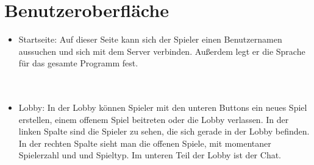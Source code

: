 \documentclass{article}
\begin{document}
\section{Benutzeroberfläche}
\begin{itemize}
	\item Startseite:  Auf dieser Seite kann sich der Spieler einen Benutzernamen aussuchen und sich mit dem Server verbinden. Außerdem legt er die Sprache für das gesamte Programm fest.\\ 				\ \\
		\ \\
	\item \gls{Lobby}: In der \gls{Lobby} können Spieler mit den unteren Buttons ein neues Spiel erstellen,  einem offenem Spiel 					beitreten oder die \gls{Lobby} verlassen. In der linken Spalte sind die Spieler zu sehen, die sich gerade in der 					\gls{Lobby} befinden. In der rechten Spalte sieht 					man die offenen Spiele, mit momentaner Spielerzahl und und Spieltyp. Im unteren Teil der Lobby ist der Chat.\\
		\ \\

\end{itemize}
\end{document}
